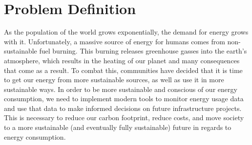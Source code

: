 \documentclass[onecolumn, draftclsnofoot,10pt, compsoc]{IEEEtran}
\begin{document}
    \section{Problem Definition}
    As the population of the world grows exponentially, the demand for energy grows with it. Unfortunately, a massive source of energy for humans comes from non-sustainable fuel burning. This burning releases greenhouse gasses into the earth's atmosphere, which results in the heating of our planet and many consequences that come as a result. To combat this, communities have decided that it is time to get our energy from more sustainable sources, as well as use it in more sustainable ways. In order to be more sustainable and conscious of our energy consumption, we need to implement modern tools to monitor energy usage data and use that data to make informed decisions on future infrastructure projects. This is necessary to reduce our carbon footprint, reduce costs, and move society to a more sustainable (and eventually fully sustainable) future in regards to energy consumption.\\
\end{document}
